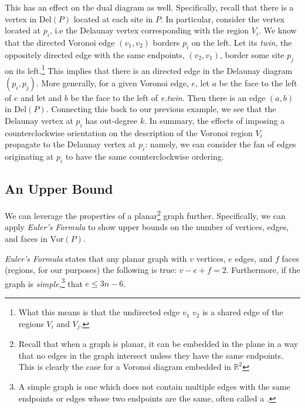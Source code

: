 \documentclass[12pt,twoside]{reedthesis}
\begin{document}
      This has an effect on the dual diagram as well. Specifically, recall that there is a vertex in $\mbox{Del}(P)$ located at each site in $P$. In particular, consider the vertex located at $p_{i}$, i.e the Delaunay vertex corresponding with the region $V_{i}$. We know that the directed Voronoi edge $(v_{1}, v_{2})$ borders $p_{i}$ on the left. Let its \emph{twin}, the oppositely directed edge with the same endpoints, $(v_{2}, v_{1})$, border some site $p_{j}$ on its left.\footnote{What this means is that the undirected edge $v_{1}$ $v_{2}$ is a shared edge of the regions $V_{i}$ and $V_{j}$.} This implies that there is an directed edge in the Delaunay diagram $(p_{i}, p_{j})$. More generally, for a given Voronoi edge, $e$, let $a$ be the face to the left of $e$ and let and $b$ be the face to the left of \textit{e.twin}. Then there is an edge $(a, b)$ in $\mbox{Del}(P)$. Connecting this back to our previous example, we see that the Delaunay vertex at $p_{i}$ has out-degree $k$. In summary, the effects of imposing a counterclockwise orientation on the description of the Voronoi region $V_{i}$ propagate to the Delaunay vertex at $p_{i}$: namely, we can consider the fan of edges originating at $p_{i}$ to have the same counterclockwise ordering. 

    \subsection{An Upper Bound} %
    \label{sub:an_upper_bound}

      We can leverage the properties of a planar\footnote{Recall that when a graph is planar, it can be embedded in the plane in a way that no edges in the graph intersect unless they have the same endpoints. This is clearly the case for a Voronoi diagram embedded in $\mathds{R}^2$} graph further. Specifically, we can apply \emph{Euler's Formula} to show upper bounds on the number of vertices, edges, and faces in $\mbox{Vor}(P)$. 

      \emph{Euler's Formula} states that any planar graph with $v$ vertices, $e$ edges, and $f$ faces (regions, for our purposes) the following is true: $v - e + f = 2.$ Furthermore, if the graph is \emph{simple,}\footnote{A simple graph is one which does not contain multiple edges with the same endpoints or edges whose two endpoints are the same, often called a .} that $e \leq 3n -6$.\par
\end{document}
